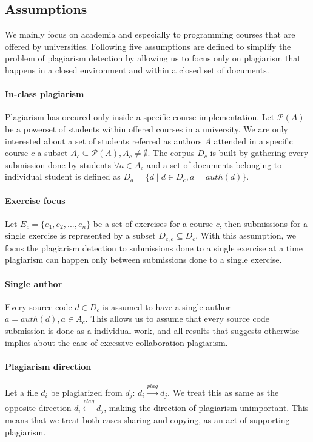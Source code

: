 \subsection{Assumptions}

We mainly focus on academia and especially to programming courses that are offered by 
universities. Following five assumptions are defined to simplify the problem of plagiarism
detection by allowing us to focus only on plagiarism that happens in a closed environment and within a closed set of documents. 

\paragraph{In-class plagiarism} Plagiarism has occured only inside a 
specific course implementation. Let $\mathcal{P}(A)$ be a powerset of students within offered courses in a university. We are only interested about a set of students referred as authors $A$ attended in a specific course $c$ \ie a subset $A_c \subseteq \mathcal{P}(A), A_c \neq \emptyset$. The corpus $D_c$ is built by gathering every submission done by students $\forall a \in A_c$ and a set of documents belonging to individual student is defined as $D_a = \{d \mid d \in D_c, a = auth(d)\}$. 


\paragraph{Exercise focus} 
Let $E_c = \{e_1, e_2, ..., e_n\}$ be a set of exercises for a course $c$, then submissions for a single exercise is represented by a subset $D_{c,e} \subseteq D_c$. With this assumption, we focus the plagiarism detection to submissions done to a single exercise at a time \ie plagiarism can happen only between submissions done to a single exercise.

\paragraph{Single author} 
Every source code $d \in D_c$ is assumed to have a single author $a = auth(d), a \in A_c$. This allows us to assume that every source code submission is done as a individual work, and all results that suggests otherwise implies about the case of excessive collaboration \ie plagiarism. 

\paragraph{Plagiarism direction} 
Let a file $d_i$ be plagiarized from $d_j$: $d_i \xrightarrow{plag} d_j$. We treat this as same as the opposite direction $d_i \xleftarrow{plag} d_j$, making the direction of plagiarism unimportant. This means that we treat both cases sharing and copying, as an act of supporting plagiarism. 

